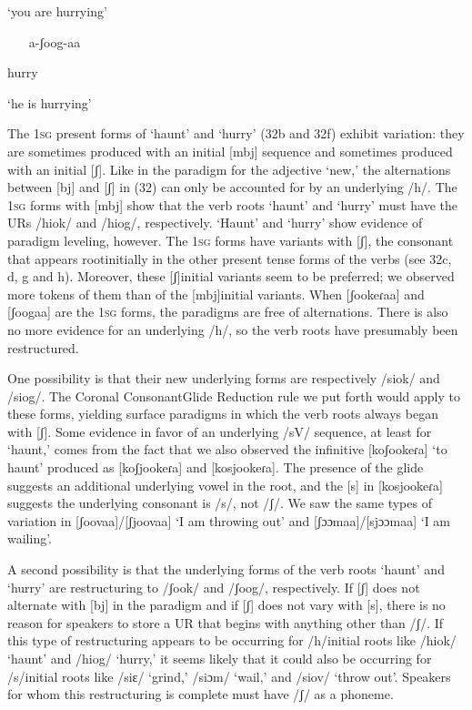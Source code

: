 \documentclass[output=paper]{langsci/langscibook}
\begin{document}
\textsc{‘}you are hurrying’

\begin{itemize}
\item [a-ʃoog-aa]

\end{itemize}

hurry

\textsc{‘}he is hurrying’

The 1\textsc{sg} present forms of ‘haunt’ and ‘hurry’ (32b and 32f) exhibit variation: they are sometimes produced with an initial [mbj] sequence and sometimes produced with an initial [ʃ]. Like in the paradigm for the adjective ‘new,’ the alternations between [bj] and [ʃ] in (32) can only be accounted for by an underlying /h/. The 1\textsc{sg} forms with [mbj] show that the verb roots ‘haunt’ and ‘hurry’ must have the URs /hiok/ and /hiog/, respectively. ‘Haunt’ and ‘hurry’ show evidence of paradigm leveling, however. The 1\textsc{sg} forms have variants with [ʃ], the consonant that appears rootinitially in the other present tense forms of the verbs (see 32c, d, g and h). Moreover, these [ʃ]initial variants seem to be preferred; we observed more tokens of them than of the [mbj]initial variants. When [ʃookeɾaa] and [ʃoogaa] are the 1\textsc{sg} forms, the paradigms are free of alternations. There is also no more evidence for an underlying /h/, so the verb roots have presumably been restructured. 

One possibility is that their new underlying forms are respectively /siok/ and /siog/. The Coronal ConsonantGlide Reduction rule we put forth would apply to these forms, yielding surface paradigms in which the verb roots always began with [ʃ]. Some evidence in favor of an underlying /sV/ sequence, at least for ‘haunt,’ comes from the fact that we also observed the infinitive [koʃookeɾa] ‘to haunt’ produced as [koʃjookeɾa] and [kosjookeɾa]. The presence of the glide suggests an additional underlying vowel in the root, and the [s] in [kosjookeɾa] suggests the underlying consonant is /s/, not /ʃ/. We saw the same types of variation in [ʃoovaa]/[ʃjoovaa] ‘I am throwing out’ and [ʃɔɔmaa]/[sjɔɔmaa] ‘I am wailing’. 

A second possibility is that the underlying forms of the verb roots ‘haunt’ and ‘hurry’ are restructuring to /ʃook/ and /ʃoog/, respectively. If [ʃ] does not alternate with [bj] in the paradigm and if [ʃ] does not vary with [s], there is no reason for speakers to store a UR that begins with anything other than /ʃ/. If this type of restructuring appears to be occurring for /h/initial roots like /hiok/ ‘haunt’ and /hiog/ ‘hurry,’ it seems likely that it could also be occurring for /s/initial roots like /siɛ/ ‘grind,’ /siɔm/ ‘wail,’ and /siov/ ‘throw out’. Speakers for whom this restructuring is complete must have /ʃ/ as a phoneme. 
\end{document}

